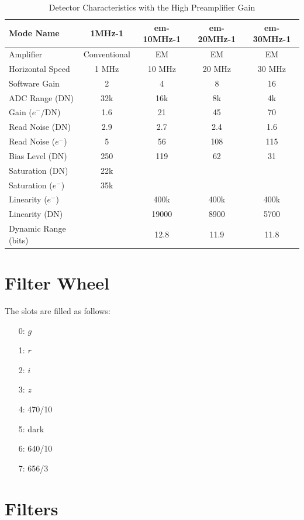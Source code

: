 \begin{table}
    \centering
    \begin{tabular}{lcccc}
    \hline
    Mode Name&1MHz-1&em-10MHz-1&em-20MHz-1&em-30MHz-1\\
    \hline
    Amplifier&Conventional&EM&EM&EM\\
    Horizontal Speed&1 MHz&10 MHz&20 MHz&30 MHz\\
    Software Gain&2&4&8&16\\
    ADC Range (DN)&32k&16k&8k&4k\\
    Gain ($e^-$/DN)&1.6&21&45&70\phantom{0}\\
    Read Noise (DN)&2.9&2.7&2.4&1.6\\
    Read Noise ($e^-$)&5&56&108&115\\
    Bias Level (DN)&250&119&62&31\\
    Saturation (DN)&22k&\\
    Saturation ($e^-$)&35k&\\
    Linearity ($e^-$)&&400k&400k&400k\\
    Linearity (DN)&&19000&8900&5700\\
    Dynamic Range (bits)&&12.8&11.9&11.8\\
    \hline
    \end{tabular}
    \caption{Detector Characteristics with the High Preamplifier Gain}
    \label{table:detector-characteristics-high-gain}
\end{table}

\section{Filter Wheel}

The slots are filled as follows:
    \begin{enumerate}
        \item[0:] $g$
        \item[1:] $r$
        \item[2:] $i$
        \item[3:] $z$
        \item[4:] 470/10
        \item[5:] dark
        \item[6:] 640/10
        \item[7:] 656/3
    \end{enumerate}
    
\section{Filters}


